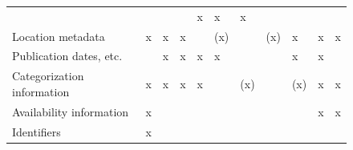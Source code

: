 \documentclass{article}
\begin{document}
\begin{figure}
\begin{tabular}{lllllllllll}
& 

& 

& 

& x

& x

& x

\\
Location metadata

& x

& x

& x

& 

& (x)

& 

& (x)

& x

& x

& x

\\
Publication dates, etc.

& 

& x

& x

& x

& x

& 

& 

& x

& x

& 

\\
Categorization information

& x

& x

& x

& x

& 

& (x)

& 

& (x)

& x

& x

\\
Availability information

& x

& 

& 

& 

& 

& 

& 

& 

& x

& x

\\
Identifiers

& x


\end{tabular}
\end{figure}
\end{document}
